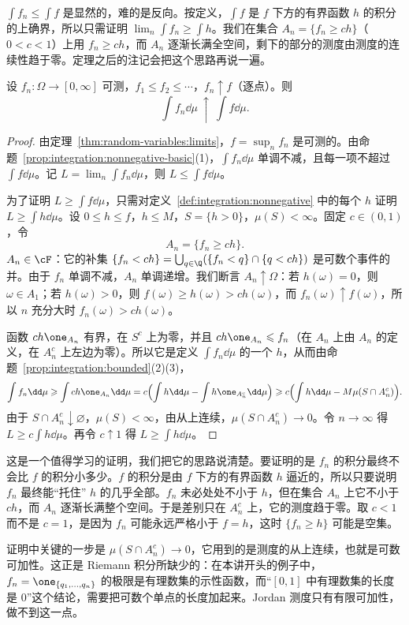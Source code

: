 \begin{remark}[证明思路]
$\int f_n\leqslant\int f$ 是显然的，难的是反向。按定义，$\int f$ 是 $f$ 下方的有界函数 $h$ 的积分的上确界，所以只需证明 $\lim_n\int f_n\geqslant\int h$。我们在集合 $A_n=\{f_n\geqslant ch\}$（$0<c<1$）上用 $f_n\geqslant ch$，而 $A_n$ 逐渐长满全空间，剩下的部分的测度由测度的连续性趋于零。定理之后的注记会把这个思路再说一遍。
\end{remark}

\begin{theorem}\label{thm:integration:mct}
设 $f_n:\Omega\to[0,\infty]$ 可测，$f_1\leqslant f_2\leqslant\cdots$，$f_n\uparrow f$（逐点）。则
\[
\int f_n\dd\mu\ \uparrow\ \int f\dd\mu .
\]
\end{theorem}
\begin{proof}
由定理~\ref{thm:random-variables:limits}，$f=\sup_nf_n$ 是可测的。由命题~\ref{prop:integration:nonnegative-basic}(1)，$\int f_n\dd\mu$ 单调不减，且每一项不超过 $\int f\dd\mu$。记 $L=\lim_n\int f_n\dd\mu$，则 $L\leqslant\int f\dd\mu$。

为了证明 $L\geqslant\int f\dd\mu$，只需对定义~\ref{def:integration:nonnegative} 中的每个 $h$ 证明 $L\geqslant\int h\dd\mu$。设 $0\leqslant h\leqslant f$，$h\leqslant M$，$S=\{h>0\}$，$\mu(S)<\infty$。固定 $c\in(0,1)$，令
\[
A_n=\{f_n\geqslant ch\}.
\]
$A_n\in\cF$：它的补集 $\{f_n<ch\}=\bigcup_{q\in\Q}(\{f_n<q\}\cap\{q<ch\})$ 是可数个事件的并。由于 $f_n$ 单调不减，$A_n$ 单调递增。我们断言 $A_n\uparrow\Omega$：若 $h(\omega)=0$，则 $\omega\in A_1$；若 $h(\omega)>0$，则 $f(\omega)\geqslant h(\omega)>ch(\omega)$，而 $f_n(\omega)\uparrow f(\omega)$，所以 $n$ 充分大时 $f_n(\omega)>ch(\omega)$。

函数 $ch\one_{A_n}$ 有界，在 $S^c$ 上为零，并且 $ch\one_{A_n}\leqslant f_n$（在 $A_n$ 上由 $A_n$ 的定义，在 $A_n^c$ 上左边为零）。所以它是定义 $\int f_n\dd\mu$ 的一个 $h$，从而由命题~\ref{prop:integration:bounded}(2)(3)，
\[
\int f_n\dd\mu\geqslant\int ch\one_{A_n}\dd\mu=c\Bigl(\int h\dd\mu-\int h\one_{A_n^c}\dd\mu\Bigr)\geqslant c\Bigl(\int h\dd\mu-M\mu(S\cap A_n^c)\Bigr).
\]
由于 $S\cap A_n^c\downarrow\varnothing$，$\mu(S)<\infty$，由从上连续，$\mu(S\cap A_n^c)\to0$。令 $n\to\infty$ 得 $L\geqslant c\int h\dd\mu$。再令 $c\uparrow1$ 得 $L\geqslant\int h\dd\mu$。
\end{proof}

\begin{remark}
这是一个值得学习的证明，我们把它的思路说清楚。要证明的是 $f_n$ 的积分最终不会比 $f$ 的积分小多少。$f$ 的积分是由 $f$ 下方的有界函数 $h$ 逼近的，所以只要说明 $f_n$ 最终能“托住” $h$ 的几乎全部。$f_n$ 未必处处不小于 $h$，但在集合 $A_n$ 上它不小于 $ch$，而 $A_n$ 逐渐长满整个空间。于是差别只在 $A_n^c$ 上，它的测度趋于零。取 $c<1$ 而不是 $c=1$，是因为 $f_n$ 可能永远严格小于 $f=h$，这时 $\{f_n\geqslant h\}$ 可能是空集。

证明中关键的一步是 $\mu(S\cap A_n^c)\to0$，它用到的是测度的从上连续，也就是可数可加性。这正是 Riemann 积分所缺少的：在本讲开头的例子中，$f_n=\one_{\{q_1,\dots,q_n\}}$ 的极限是有理数集的示性函数，而“$[0,1]$ 中有理数集的长度是 $0$”这个结论，需要把可数个单点的长度加起来。Jordan 测度只有有限可加性，做不到这一点。
\end{remark}

